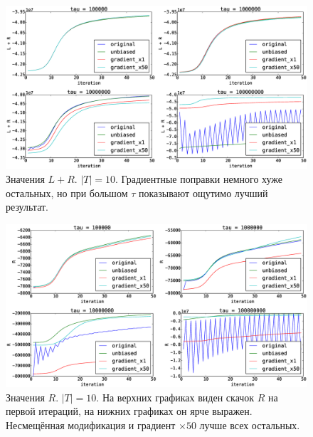 \documentclass[utf8]{beamer}
\begin{document}
	\begin{frame}
\begin{figure}
	\centering   
	\caption{Значения $L + R$. $|T| = 10$. Градиентные поправки немного хуже остальных, но при большом $\tau$ показывают ощутимо лучший результат.} 
	\medskip
	\includegraphics[width=0.9\linewidth]{presentation_pictures/topics_10_LR_values.eps}  
\end{figure}
	\end{frame}

	\begin{frame}
\begin{figure}
	\centering   
	\caption{Значения $R$. $|T| = 10$.  На верхних графиках виден скачок $R$ на первой итераций, на нижних графиках он ярче выражен. Несмещённая модификация и градиент $\times 50$  лучше всех остальных.} 
	\medskip
	\includegraphics[width=0.9\linewidth]{presentation_pictures/topics_10_R_values.eps}  
\end{figure}
	\end{frame}
	
\end{document}
